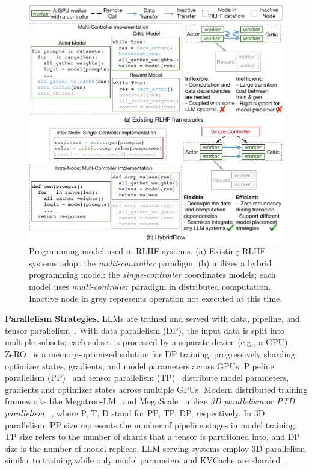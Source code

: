 \begin{figure}[!t]
    \includegraphics[width=\linewidth]{figs/fig_programming_rlhf_withcode_test.pdf}
    \vspace{-5mm}
    \caption{
    Programming model used in RLHF systems. (a) Existing RLHF systems adopt the \textit{multi-controller} paradigm.
    (b) \sysname{} utilizes a hybrid programming model: the \textit{single-controller} coordinates models; each model uses \textit{multi-controller} paradigm in distributed computation. Inactive node in grey represents operation not executed at this time. 
    }
    \label{fig:program_model_compare}
    \vspace{-3mm}
\end{figure}

\noindent\textbf{Parallelism Strategies.}
LLMs are trained and served with data, pipeline, and tensor parallelism~\cite{narayanan2021efficient,jiang2024megascale, kwon2023efficient}. 
With data parallelism (DP), the input data is split into multiple subsets; each subset is processed %
by a separate %
device (e.g., a GPU)~\cite{sergeev2018horovod}. 
ZeRO~\cite{rajbhandari2020zero} is a memory-optimized solution for DP training, progressively sharding optimizer states, gradients, and model parameters across GPUs.
Pipeline parallelism (PP)~\cite{huang2019gpipe, narayanan2019pipedream} and tensor parallelism (TP)~\cite{shoeybi2019megatron}
distribute model parameters, gradients and optimizer states across multiple GPUs. 
Modern distributed training frameworks like Megatron-LM~\cite{shoeybi2019megatron} and MegaScale~\cite{jiang2024megascale} utilize \textit{3D parallelism} or \textit{PTD parallelism} %
~\cite{narayanan2021efficient}, where P, T, D stand for PP, TP, DP, respectively. %
In 3D parallelism, PP size represents the number of pipeline stages in model training, TP size refers to the number of shards that a tensor is partitioned into, and DP size is the number of model replicas.
LLM serving systems
employ 3D parallelism similar to training while only model parameters and KVCache are sharded~\cite{kwon2023efficient, nvidiaTensorRTLLM, holmes2024deepspeed}. 




